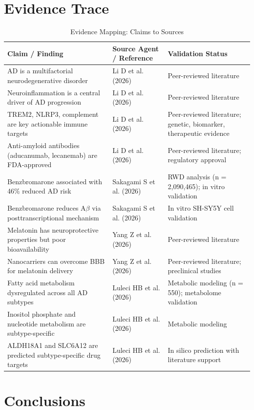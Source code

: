 \documentclass[11pt, a4paper]{article}
\begin{document}
\section{Evidence Trace}

\begin{longtable}{p{2.5cm} p{4cm} p{7cm}}
\caption{Evidence Mapping: Claims to Sources}\\
\toprule
\textbf{Claim / Finding} & \textbf{Source Agent / Reference} & \textbf{Validation Status} \\
\midrule
\endfirsthead
\hline
\endfoot
\bottomrule
\endlastfoot
AD is a multifactorial neurodegenerative disorder & Li D et al. (2026) & Peer-reviewed literature \\
Neuroinflammation is a central driver of AD progression & Li D et al. (2026) & Peer-reviewed literature \\
TREM2, NLRP3, complement are key actionable immune targets & Li D et al. (2026) & Peer-reviewed literature; genetic, biomarker, therapeutic evidence \\
Anti-amyloid antibodies (aducanumab, lecanemab) are FDA-approved & Li D et al. (2026) & Peer-reviewed literature; regulatory approval \\
Benzbromarone associated with 46\% reduced AD risk & Sakagami S et al. (2026) & RWD analysis (n = 2,090,465); in vitro validation \\
Benzbromarone reduces A$\beta$ via posttranscriptional mechanism & Sakagami S et al. (2026) & In vitro SH-SY5Y cell validation \\
Melatonin has neuroprotective properties but poor bioavailability & Yang Z et al. (2026) & Peer-reviewed literature \\
Nanocarriers can overcome BBB for melatonin delivery & Yang Z et al. (2026) & Peer-reviewed literature; preclinical studies \\
Fatty acid metabolism dysregulated across all AD subtypes & Luleci HB et al. (2026) & Metabolic modeling (n = 550); metabolome validation \\
Inositol phosphate and nucleotide metabolism are subtype-specific & Luleci HB et al. (2026) & Metabolic modeling \\
ALDH18A1 and SLC6A12 are predicted subtype-specific drug targets & Luleci HB et al. (2026) & In silico prediction with literature support \\
\hline
\end{longtable}

\section{Conclusions}
\end{document}
